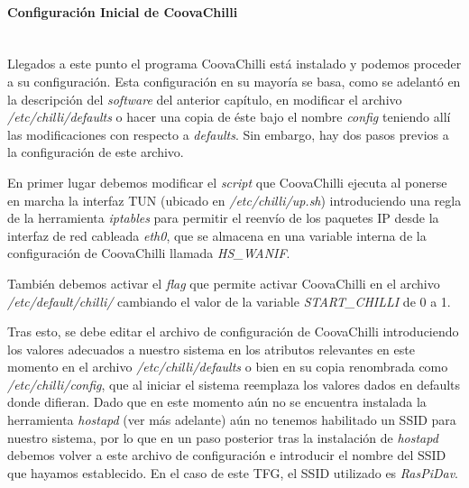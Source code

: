 \paragraph{Configuración Inicial de CoovaChilli} \label{CoovaConfig} ~\\

Llegados a este punto el programa CoovaChilli está instalado y podemos proceder a su configuración. Esta configuración en su mayoría se basa, como se adelantó en la descripción del \emph{software} del anterior capítulo, en modificar el archivo \emph{/etc/chilli/defaults} o hacer una copia de éste bajo el nombre \emph{config} teniendo allí las modificaciones con respecto a \emph{defaults}. Sin embargo, hay dos pasos previos a la configuración de este archivo.

En primer lugar debemos modificar el \emph{script} que CoovaChilli ejecuta al ponerse en marcha la interfaz TUN (ubicado en \emph{/etc/chilli/up.sh}) introduciendo una regla de la herramienta \emph{iptables} para permitir el reenvío de los paquetes IP desde la interfaz de red cableada \emph{eth0}, que se almacena en una variable interna de la configuración de CoovaChilli llamada \emph{HS\_WANIF}.


También debemos activar el \emph{flag} que permite activar CoovaChilli en el archivo \emph{/etc/default/chilli/} cambiando el valor de la variable \emph{START\_CHILLI} de 0 a 1.

Tras esto, se debe editar el archivo de configuración de CoovaChilli introduciendo los valores adecuados a nuestro sistema en los atributos relevantes en este momento en el archivo \emph{/etc/chilli/defaults} o bien en su copia renombrada como \emph{/etc/chilli/config}, que al iniciar el sistema reemplaza los valores dados en defaults donde difieran. Dado que en este momento aún no se encuentra instalada la herramienta \emph{hostapd} (ver más adelante) aún no tenemos habilitado un SSID para nuestro sistema, por lo que en un paso posterior tras la instalación de \emph{hostapd} debemos volver a este archivo de configuración e introducir el nombre del SSID que hayamos establecido. En el caso de este TFG, el SSID utilizado es \emph{RasPiDav}.

